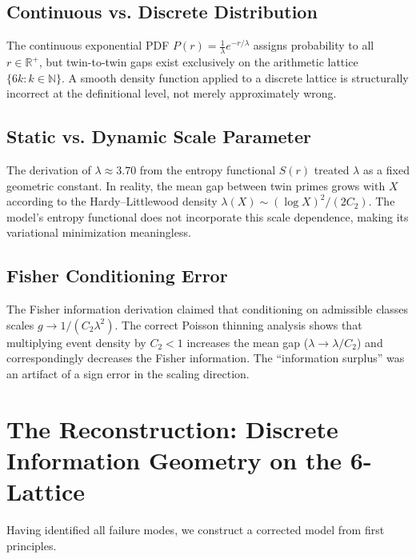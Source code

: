 \documentclass[11pt]{article}
\begin{document}
\subsection{Continuous vs. Discrete Distribution}
The continuous exponential PDF $P(r) = \frac{1}{\lambda}e^{-r/\lambda}$ assigns probability to all $r \in \mathbb{R}^+$, but twin-to-twin gaps exist exclusively on the arithmetic lattice $\{6k : k \in \mathbb{N}\}$. A smooth density function applied to a discrete lattice is structurally incorrect at the definitional level, not merely approximately wrong.

\subsection{Static vs. Dynamic Scale Parameter}
The derivation of $\lambda \approx 3.70$ from the entropy functional $S(r)$ treated $\lambda$ as a fixed geometric constant. In reality, the mean gap between twin primes grows with $X$ according to the Hardy--Littlewood density $\lambda(X) \sim (\log X)^2/(2C_2)$. The model's entropy functional does not incorporate this scale dependence, making its variational minimization meaningless.

\subsection{Fisher Conditioning Error}
The Fisher information derivation claimed that conditioning on admissible classes scales $g \to 1/(C_2\lambda^2)$. The correct Poisson thinning analysis shows that multiplying event density by $C_2 < 1$ increases the mean gap ($\lambda \to \lambda/C_2$) and correspondingly decreases the Fisher information. The ``information surplus'' was an artifact of a sign error in the scaling direction.

\section{The Reconstruction: Discrete Information Geometry on the 6-Lattice}
Having identified all failure modes, we construct a corrected model from first principles.
\end{document}

